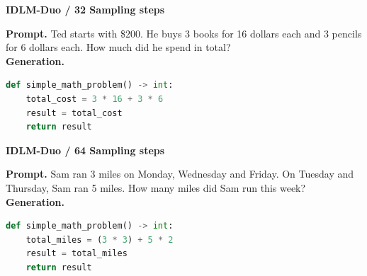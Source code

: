 \begin{tcolorbox}
\condrowsep
\noindent
\begin{minipage}[t]{0.31\linewidth}
{\footnotesize\bfseries\textcolor{tinyorange}{IDLM-Duo / 32 Sampling steps}}\\[-0.1mm]
\end{minipage}\hfill
\begin{minipage}[t]{0.66\linewidth}
{\scriptsize\bfseries Prompt.}
{\scriptsize Ted starts with \$200. He buys 3 books for 16 dollars each and 3 pencils for 6 dollars each. How much did he spend in total?}\\[-0.1mm]
{\scriptsize\bfseries Generation.}\\[-2.4mm]
\begin{lstlisting}[language=Python,basicstyle=\ttfamily\tiny,columns=fullflexible,keepspaces=true,breaklines=true,aboveskip=0pt,belowskip=0pt,xleftmargin=0.04\linewidth,xrightmargin=0.04\linewidth]
def simple_math_problem() -> int:
    total_cost = 3 * 16 + 3 * 6
    result = total_cost
    return result
\end{lstlisting}
\end{minipage}

\par\vspace{1.0mm}
\noindent
\begin{minipage}[t]{0.31\linewidth}
{\footnotesize\bfseries\textcolor{tinyorange}{IDLM-Duo / 64 Sampling steps}}\\[-0.1mm]
\end{minipage}\hfill
\begin{minipage}[t]{0.66\linewidth}
{\scriptsize\bfseries Prompt.}
{\scriptsize Sam ran 3 miles on Monday, Wednesday and Friday. On Tuesday and Thursday, Sam ran 5 miles. How many miles did Sam run this week?}\\[-0.1mm]
{\scriptsize\bfseries Generation.}\\[-2.4mm]
\begin{lstlisting}[language=Python,basicstyle=\ttfamily\tiny,columns=fullflexible,keepspaces=true,breaklines=true,aboveskip=0pt,belowskip=0pt,xleftmargin=0.04\linewidth,xrightmargin=0.04\linewidth]
def simple_math_problem() -> int:
    total_miles = (3 * 3) + 5 * 2
    result = total_miles
    return result
\end{lstlisting}
\end{minipage}


\end{tcolorbox}
